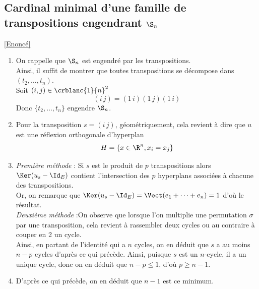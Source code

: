 \documentclass[8pt]{book}
\begin{document}
	\subsection{Cardinal minimal d'une famille de transpositions engendrant $\S_n$ }
	\label{Cardinal minimal d'une famille de transpositions engendrant Sn corrigé}
	\textcolor{blue}{\hyperref[Cardinal minimal d'une famille de transpostions engendrant Sn]{[Enoncé]}}\\
	\begin{enumerate}[leftmargin=*]
		\item On rappelle que $\S_n$ est engendré par les transpositions.\\
		Ainsi, il suffit de montrer que toutes transpositions se décompose dans $(t_2,\dots,t_n)$.\\
		Soit $(i,j)\in \crblanc{1}{n}^2$ \[(i \, j)= (1 \, i)(1 \, j)(1 \, i)\]
		Donc $\{t_2,\dots,t_n\}$ engendre $\S_n$.
		\item Pour la transposition $s=(i \, j)$, géométriquement, cela revient à dire que $u$ est une réflexion orthogonale d'hyperplan \[H=\{x\in \R^n, x_i=x_j\}\]
		\item \textit{Première méthode} : Si $s$ est le produit de $p$ transpositions alors $\Ker(u_s-\Id_E)$ contient l'intersection des $p$ hyperplans associées à chacune des transpositions.\\
		Or, on remarque que $\Ker(u_s-\Id_E)=\Vect(e_1+\dots+e_n)=1$ d'où le résultat.\\
		\textit{Deuxième méthode} :On observe que lorsque l'on multiplie une permutation $\sigma$ par une transposition, cela revient à rassembler deux cycles ou au contraire à couper en 2 un cycle.\\
		Ainsi, en partant de l'identité qui a $n$ cycles, on en déduit que $s$ a au moins $n-p$ cycles d'après ce qui précède. Ainsi, puisque $s$ est un $n$-cycle, il a un unique cycle, donc on en déduit que $n-p\leq 1$, d'où $p\geq n-1$.
		\item D'après ce qui précède, on en déduit que $n-1$ est ce minimum.
	\end{enumerate}
	
\end{document}
